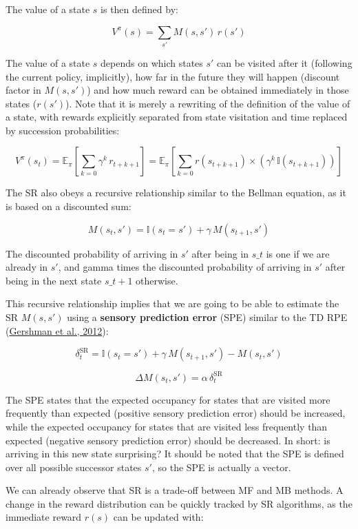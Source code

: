 \documentclass[
  11pt,
]{article}
\begin{document}
The value of a state \(s\) is then defined by:

\[
    V^\pi(s) = \sum_{s'} M(s, s') \, r(s')
\]

The value of a state \(s\) depends on which states \(s'\) can be visited
after it (following the current policy, implicitly), how far in the
future they will happen (discount factor in \(M(s, s')\)) and how much
reward can be obtained immediately in those states (\(r(s')\)). Note
that it is merely a rewriting of the definition of the value of a state,
with rewards explicitly separated from state visitation and time
replaced by succession probabilities:

\[V^\pi(s_t) = \mathbb{E}_{\pi} [\sum_{k=0} \gamma^k \, r_{t+k+1}] = \mathbb{E}_{\pi} [\sum_{k=0} r(s_{t+k+1}) \times (\gamma^k \, \mathbb{I}(s_{t+k+1}))]\]

The SR also obeys a recursive relationship similar to the Bellman
equation, as it is based on a discounted sum:

\[
    M(s_t, s') = \mathbb{I}(s_t = s') + \gamma \, M(s_{t+1}, s')
\]

The discounted probability of arriving in \(s'\) after being in \(s\_t\)
is one if we are already in \(s'\), and gamma times the discounted
probability of arriving in \(s'\) after being in the next state
\(s\_{t+1}\) otherwise.

This recursive relationship implies that we are going to be able to
estimate the SR \(M(s, s')\) using a \textbf{sensory prediction error}
(SPE) similar to the TD RPE
(\protect\hyperlink{ref-Gershman2012}{Gershman et al., 2012}):

\[
    \delta^\text{SR}_t = \mathbb{I}(s_t = s') + \gamma \, M(s_{t+1}, s') - M(s_t, s')
\]

\[
    \Delta M(s_t, s') = \alpha \, \delta^\text{SR}_t
\]

The SPE states that the expected occupancy for states that are visited
more frequently than expected (positive sensory prediction error) should
be increased, while the expected occupancy for states that are visited
less frequently than expected (negative sensory prediction error) should
be decreased. In short: is arriving in this new state surprising? It
should be noted that the SPE is defined over all possible successor
states \(s'\), so the SPE is actually a vector.

We can already observe that SR is a trade-off between MF and MB methods.
A change in the reward distribution can be quickly tracked by SR
algorithms, as the immediate reward \(r(s)\) can be updated with:
\end{document}

